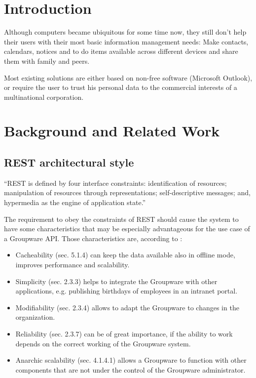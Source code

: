 \documentclass[12pt,a4paper,twoside]{scrartcl}		%
\newcommand{\citeurl}[2]{\url{#1} (#2)}
\begin{document}
\section{Introduction}
\label{sec:introduction}

Although computers became ubiquitous for some time now, they still don't help
their users with their most basic information management needs: Make contacts,
calendars, notices and to do items available across different devices and share
them with family and peers.

Most existing solutions are either based on non-free software (Microsoft Outlook),
or require the user to trust his personal data to the commercial
interests of a multinational corporation.


\section{Background and Related Work}
\label{sec:backgr-relat-work}

\subsection{REST architectural style}


\cite[sec. 5.1.5]{Fielding2000}

 ``REST is defined by four
  interface constraints: identification of resources; manipulation of resources
  through representations; self-descriptive messages; and, hypermedia as the
  engine of application state.''


The requirement to obey the constraints of REST should cause the system to have
some characteristics that may be especially advantageous for the use case of a
Groupware API. Those characteristics are, according to \cite{Fielding2000}:

\begin{itemize}
\item Cacheability (sec. 5.1.4) can keep the data available also in offline
  mode, improves performance and scalability.
\item Simplicity (sec. 2.3.3) helps to integrate the Groupware with other
  applications, e.g. publishing birthdays of employees in an intranet portal.
\item Modifiability (sec. 2.3.4) allows to adapt the Groupware to changes in the
  organization.
\item Reliability (sec. 2.3.7) can be of great importance, if the ability to
  work depends on the correct working of the Groupware system.
\item Anarchic scalability (sec. 4.1.4.1) allows a Groupware to function with
  other components that are not under the control of the Groupware
  administrator.
\end{itemize}
\end{document}
